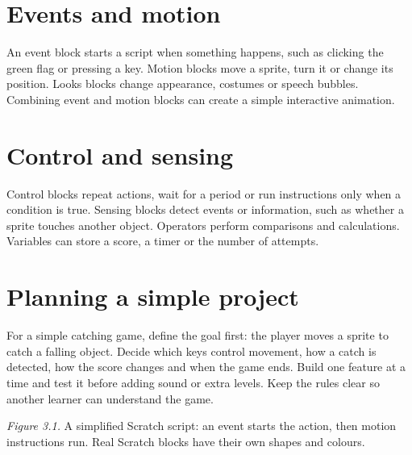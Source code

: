 \documentclass[11pt,openany,oneside]{book}
\begin{document}
\section{Events and motion}
An event block starts a script when something happens, such as clicking the green flag or pressing a key. Motion blocks move a sprite, turn it or change its position. Looks blocks change appearance, costumes or speech bubbles. Combining event and motion blocks can create a simple interactive animation.

\section{Control and sensing}
Control blocks repeat actions, wait for a period or run instructions only when a condition is true. Sensing blocks detect events or information, such as whether a sprite touches another object. Operators perform comparisons and calculations. Variables can store a score, a timer or the number of attempts.

\section{Planning a simple project}
For a simple catching game, define the goal first: the player moves a sprite to catch a falling object. Decide which keys control movement, how a catch is detected, how the score changes and when the game ends. Build one feature at a time and test it before adding sound or extra levels. Keep the rules clear so another learner can understand the game.

\begin{center}
\end{center}
\textit{Figure 3.1.} A simplified Scratch script: an event starts the action, then motion instructions run. Real Scratch blocks have their own shapes and colours.
\end{document}
